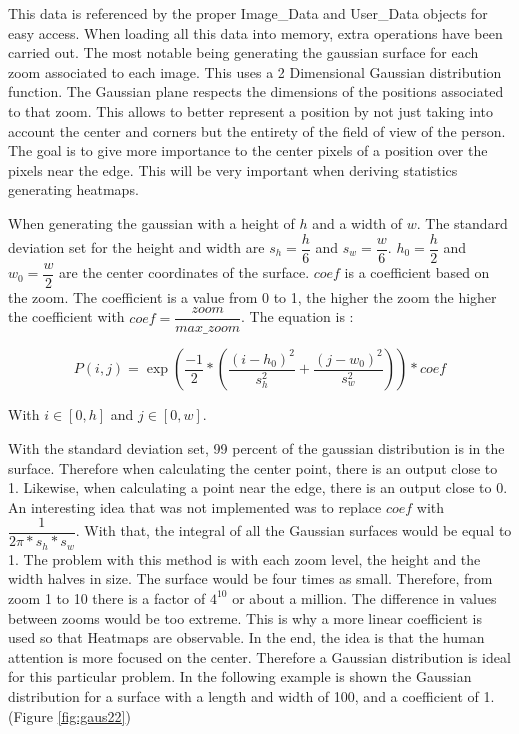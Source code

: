 \documentclass[a4paper,11pt]{report}
\numberwithin{figure}{chapter} %
\begin{document}
    This data is referenced by the proper Image\_Data and User\_Data objects for easy access.
    When loading all this data into memory, extra operations have been carried out.
    The most notable being generating the gaussian surface for each zoom associated to each image.
    This uses a 2 Dimensional Gaussian distribution function.
    The Gaussian plane respects the dimensions of the positions associated to that zoom.
    This allows to better represent a position by not just taking into account the center and corners but the entirety of the field of view of the person.
    The goal is to give more importance to the center pixels of a position over the pixels near the edge.
    This will be very important when deriving statistics generating heatmaps.

    When generating the gaussian with a height of $h$ and a width of $w$.
    The standard deviation set for the height and width are $s_h = \dfrac{h}{6}$ and $s_w = \dfrac{w}{6}$.
    $h_0 = \dfrac{h}{2}$ and $w_0 = \dfrac{w}{2}$ are the center coordinates of the surface.
    $coef$ is a coefficient based on the zoom.
    The coefficient is a value from 0 to 1, the higher the zoom the higher the coefficient with $coef = \dfrac{zoom}{max\_zoom}$.
    The equation is :

        \[P(i,j) = \exp(\dfrac{-1}{2}*(\dfrac{(i - h_0)^2}{s_h^2} + \dfrac{(j - w_0)^2}{s_w^2})) * coef \]

    With $i \in [0, h]$ and $j \in [0, w]$.

    With the standard deviation set, 99 percent of the gaussian distribution is in the surface.
    Therefore when calculating the center point, there is an output close to 1.
    Likewise, when calculating a point near the edge, there is an output close to 0.
    An interesting idea that was not implemented was to replace $coef$ with $\dfrac{1}{2\pi*s_h*s_w}$.
    With that, the integral of all the Gaussian surfaces would be equal to 1.
    The problem with this method is with each zoom level, the height and the width halves in size.
    The surface would be four times as small.
    Therefore, from zoom 1 to 10 there is a factor of $4^{10}$ or about a million.
    The difference in values between zooms would be too extreme.
    This is why a more linear coefficient is used so that Heatmaps are observable.
    In the end, the idea is that the human attention is more focused on the center.
    Therefore a Gaussian distribution is ideal for this particular problem.
    In the following example is shown the Gaussian distribution for a surface with a length and width of 100, and a coefficient of 1. (Figure \ref{fig:gaus22})
\end{document}
